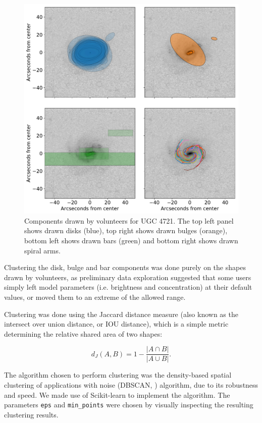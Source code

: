 \documentclass[../main.tex]{subfiles}
\begin{document}
\begin{figure}
  \includegraphics[width=17.3cm]{images__method/drawn_shapes.pdf}
  \caption{Components drawn by volunteers for UGC 4721. The top left panel shows drawn disks (blue), top right shows drawn bulges (orange), bottom left shows drawn bars (green) and bottom right shows drawn spiral arms.}
  \label{fig:drawn_shapes}
\end{figure}

Clustering the disk, bulge and bar components was done purely on the shapes drawn by volunteers, as preliminary data exploration suggested that some users simply left model parameters (i.e. brightness and concentration) at their default values, or moved them to an extreme of the allowed range.

Clustering was done using the Jaccard distance measure (also known as the intersect over union distance, or IOU distance), which is a simple metric determining the relative shared area of two shapes:

\begin{equation}
d_J(A, B) = 1 - \frac{|A \cap B|}{|A \cup B|}.
\end{equation}

The algorithm chosen to perform clustering was the density-based spatial clustering of applications with noise (DBSCAN, \citealt{dbscan}) algorithm, due to its robustness and speed. We made use of Scikit-learn \citep{scikit-learn} to implement the algorithm. The parameters \texttt{eps} and \texttt{min\_points} were chosen by visually inspecting the resulting clustering results.
\end{document}
